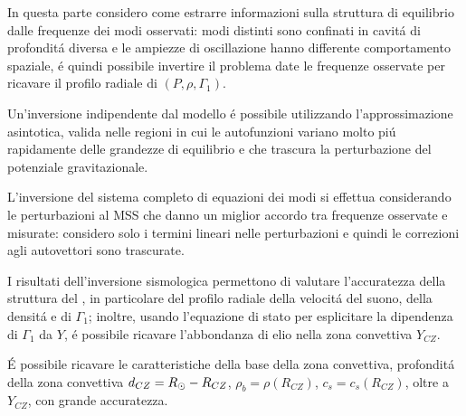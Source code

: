 In questa parte considero come estrarre informazioni sulla struttura di equilibrio dalle frequenze dei modi osservati: modi distinti sono confinati in cavit\'a di profondit\'a diversa e le ampiezze di oscillazione hanno differente comportamento spaziale, \'e quindi possibile invertire il problema date le frequenze osservate per ricavare il profilo radiale di $(P,\rho,\Gamma_1)$.

Un'inversione indipendente dal modello \'e possibile utilizzando l'approssimazione asintotica, valida nelle regioni in cui le autofunzioni variano molto pi\'u rapidamente delle grandezze di equilibrio e che trascura la perturbazione del potenziale gravitazionale.
 
L'inversione del sistema completo di equazioni dei modi si effettua considerando le perturbazioni al MSS che danno un miglior accordo tra frequenze osservate e misurate: considero solo i termini lineari nelle perturbazioni e quindi le correzioni agli autovettori sono trascurate.

I risultati dell'inversione sismologica permettono di valutare l'accuratezza della struttura del \mss{} , in particolare del profilo radiale della velocit\'a del suono, della densit\'a e di $\Gamma_1$; inoltre, usando l'equazione di stato per esplicitare la dipendenza di $\Gamma_1$ da $Y$, \'e possibile ricavare l'abbondanza di elio nella zona convettiva $Y_{CZ}$.

\'E possibile ricavare le caratteristiche della base della zona convettiva, profondit\'a della zona convettiva $d_{CZ}=R_{\odot}{}-R_{CZ}$, $\rho_b=\rho(R_{CZ})$, $c_s=c_s(R_{CZ})$, oltre a $Y_{CZ}$, con grande accuratezza.

